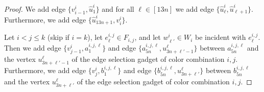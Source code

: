 \documentclass[a4paper,UKenglish,cleveref, autoref, thm-restate,anonymous]{lipics-v2021}
\begin{document}
\begin{proof}
    We add edge $\{v^i_{i-1},\hat{u}^i_1\}$ and for all $\ell\in[13n]$ we add edge $\{\hat{u}^i_\ell,\hat{u}^i_{\ell+1}\}$. Furthermore, we add edge $\{\hat{u}^i_{13n+1},v^i_i\}$. 

    Let $i<j\le k$ (skip if $i=k$), let $e_\ell^{i,j}\in F_{i,j}$, and let $w^i_{\ell'}\in W_i$ be incident with $e_\ell^{i,j}$. Then we add edge $\{v_{j-1}^i,a^{i,j,\ell}_{1}\}$ and edge $\{a^{i,j,\ell}_{5n},u^\ell_{3n+\ell'-1}\}$ between $a^{i,j,\ell}_{5n}$ and the vertex $u^\ell_{3n+\ell'-1}$ of the edge selection gadget of color combination $i,j$.
    Furthermore, we add edge $\{v_{j}^i,b^{i,j,\ell}_{1}\}$ and edge $\{b^{i,j,\ell}_{5n},u^\ell_{3n+\ell'}\}$ between $b^{i,j,\ell}_{5n}$ and the vertex $u^\ell_{3n+\ell'}$ of the edge selection gadget of color combination $i,j$.


\begin{comment}


\end{comment}
\end{proof}
\end{document}
